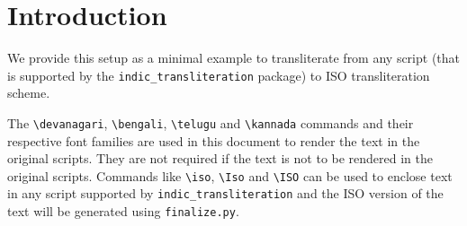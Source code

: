 \section{Introduction}

We provide this setup as a minimal example to transliterate from any script (that is supported by
the \texttt{indic\_transliteration} package) to ISO transliteration scheme.

The \texttt{\textbackslash devanagari}, \texttt{\textbackslash bengali}, \texttt{\textbackslash telugu}
and \texttt{\textbackslash kannada} commands and their respective font families are used in this document to render the
text in the original scripts. They are not required if the text is not to be rendered in the original scripts.
Commands like \texttt{\textbackslash iso}, \texttt{\textbackslash Iso} and
\texttt{\textbackslash ISO} can be used to enclose text in any script supported by \texttt{indic\_transliteration}
and the ISO version of the text will be generated using \texttt{finalize.py}.
